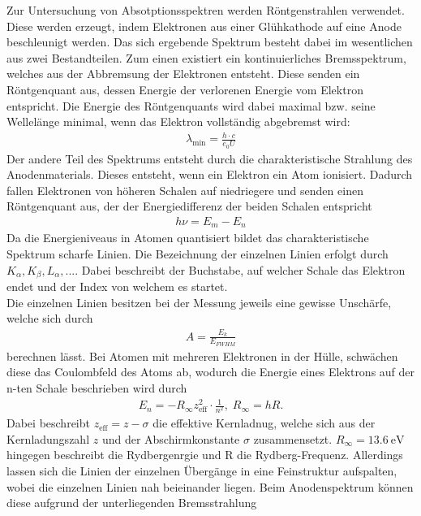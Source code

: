 Zur Untersuchung von Absotptionsspektren werden Röntgenstrahlen verwendet. Diese werden erzeugt, indem
Elektronen aus einer Glühkathode auf eine Anode beschleunigt werden. Das sich ergebende Spektrum 
besteht dabei im wesentlichen aus zwei Bestandteilen. Zum einen existiert ein kontinuierliches Bremsspektrum,
welches aus der Abbremsung der Elektronen entsteht. Diese senden ein Röntgenquant aus, dessen Energie
der verlorenen Energie vom Elektron entspricht. Die Energie des Röntgenquants wird dabei maximal 
bzw. seine Wellelänge minimal, wenn das Elektron vollständig abgebremst wird: \cite{V602}
\begin{align}
\lambda _{\text{min}}=\frac{h \cdot c}{e_0 U} \label{eq:1}
\end{align}
Der andere Teil des Spektrums entsteht durch die charakteristische Strahlung des Anodenmaterials.
Dieses entsteht, wenn ein Elektron ein Atom ionisiert. Dadurch fallen Elektronen von höheren
Schalen auf niedriegere und senden einen Röntgenquant aus, der der Energiedifferenz
der beiden Schalen entspricht \cite{V602}
\begin{align}
    h \nu = E_m - E_n \label{eq:2}
\end{align}
Da die Energieniveaus in Atomen quantisiert bildet das charakteristische Spektrum scharfe Linien.
Die Bezeichnung der einzelnen Linien erfolgt durch $K_{\alpha}, K_{\beta}, L_{\alpha},... $. 
Dabei beschreibt der Buchstabe, auf welcher Schale das Elektron endet und der Index von welchem
es startet.\\
Die einzelnen Linien besitzen bei der Messung jeweils eine gewisse Unschärfe, welche sich durch
\begin{align}
    A=\frac{E_k}{E_{FWHM}} \label{eq:3}
\end{align}
berechnen lässt.
Bei Atomen mit mehreren Elektronen in der Hülle, schwächen diese das Coulombfeld des Atoms ab,
wodurch die Energie eines Elektrons auf der n-ten Schale beschrieben wird durch \cite{V602}
\begin{align}
    E_n = - R_{\infty} z_{\text{eff}}^2 \cdot \frac{1}{n^2} \label{eq:4}, \; R_{\infty}=hR . 
\end{align}
Dabei beschreibt $z_{\text{eff}} =z-\sigma $ die effektive Kernladnug, welche sich aus der 
Kernladungszahl $z$ und der Abschirmkonstante $\sigma$ zusammensetzt. $R_{\infty}=\SI{13.6}{\electronvolt} $ hingegen
beschreibt die Rydbergenrgie und R die Rydberg-Frequenz.
Allerdings lassen sich die Linien der einzelnen Übergänge in eine Feinstruktur aufspalten, wobei die einzelnen
Linien nah beieinander liegen. Beim Anodenspektrum können diese aufgrund der unterliegenden Bremsstrahlung
